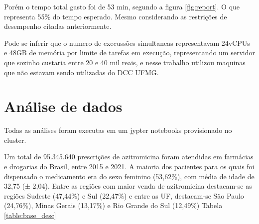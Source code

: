 Porém o tempo total gasto foi de 53 min, segundo a figura \ref{fig:report}. O que representa 55\% do tempo esperado. Mesmo considerando as restrições de desempenho citadas anteriormente.

Pode se inferir que o numero de execussões simultaneas representavam 24vCPUs e 48GB de memória por limite de tarefas em execução, representando um servidor que sozinho custaria entre 20 e 40 mil reais, e nesse trabalho utilizou maquinas que não estavam sendo utilizadas do DCC UFMG.



\section{Análise de dados}
Todas as análises foram executas em um jypter notebooks provisionado no cluster.

Um total de 95.345.640 prescrições de azitromicina foram atendidas em farmácias e drogarias do Brasil, entre 2015 e 2021. A maioria dos pacientes para os quais foi dispensado o medicamento era do sexo feminino (53,62\%), com média de idade de 32,75 (± 2,04). Entre as regiões com maior venda de azitromicina destacam-se as regiões Sudeste (47,44\%) e Sul (22,47\%) e entre as UF, destacam-se São Paulo (24,76\%), Minas Gerais (13,17\%) e Rio Grande do Sul (12,49\%) Tabela \ref{table:base_desc}

